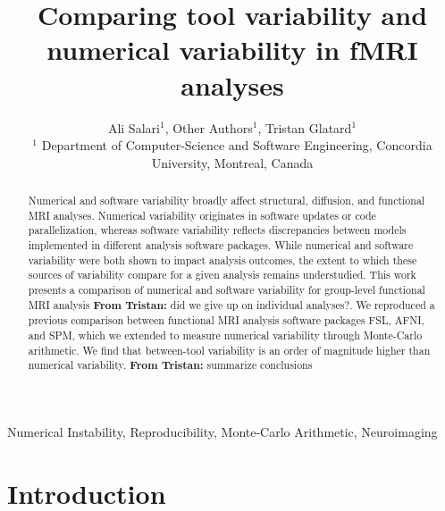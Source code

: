\documentclass[conference]{IEEEtran}
\begin{document}
\newcommand{\fslspm}{FSL-SPM\xspace}
\newcommand{\fslafni}{FSL-AFNI\xspace}
\newcommand{\afnispm}{AFNI-SPM\xspace}
\newcommand{\tristan}[1]{\color{orange}\textbf{From Tristan:} #1\color{black}\xspace}



\title{Comparing tool variability and numerical variability in fMRI analyses}

\author{Ali Salari$^1$, Other Authors$^1$, Tristan Glatard$^1$ \\ 
$^1$ Department of Computer-Science and Software Engineering, Concordia University, Montreal, Canada}

\maketitle
\begin{abstract}

Numerical and software variability broadly affect structural, diffusion, and functional MRI analyses. Numerical
variability originates in software updates or code
parallelization, whereas software variability reflects discrepancies between
models implemented in different analysis software packages. While numerical
and software variability were both shown to impact analysis outcomes, the
extent to which these sources of variability compare for a given
analysis remains understudied. This work presents a comparison of
numerical and software variability for group-level functional MRI analysis
\tristan{did we give up on individual analyses?}.
We reproduced a previous comparison between functional MRI analysis 
software packages FSL, AFNI, and SPM, which we extended to measure 
numerical variability through Monte-Carlo arithmetic. 
We find that between-tool variability is an order of magnitude higher than numerical variability.
\tristan{summarize conclusions}

\end{abstract}

\begin{IEEEkeywords}
  Numerical Instability, Reproducibility, Monte-Carlo Arithmetic, Neuroimaging
\end{IEEEkeywords}


\section{Introduction}
\end{document}
